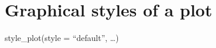 \documentclass[
  letterpaper,
  DIV=11,
  numbers=noendperiod]{scrreprt}
\begin{document}
\hypertarget{graphical-styles-of-a-plot}{%
\section{Graphical styles of a plot}\label{graphical-styles-of-a-plot}}

\begin{tcolorbox}[enhanced jigsaw, toprule=.15mm, colframe=quarto-callout-tip-color-frame, left=2mm, colback=white, breakable, bottomrule=.15mm, arc=.35mm, rightrule=.15mm, leftrule=.75mm, opacityback=0]
\begin{minipage}[t]{5.5mm}
\textcolor{quarto-callout-tip-color}{\faLightbulb}
\end{minipage}%
\begin{minipage}[t]{\textwidth - 5.5mm}
style\_plot(style = ``default'', \ldots)\end{minipage}%
\end{tcolorbox}
\end{document}
